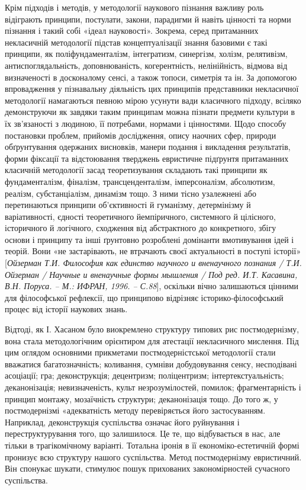 Крім підходів і методів, у методології наукового пізнання важливу роль
відіграють принципи, постулати, закони, парадигми й навіть цінності та норми
пізнання і такий собі «ідеал науковості». Зокрема, серед притаманних
некласичній методології підстав концептуалізації знання базовими є такі
принципи, як поліфундаменталізм, інтегратизм, синергізм, холізм, релятивізм,
антиспоглядальність, доповнюваність, когерентність, нелінійність, відмова від
визначеності в досконалому сенсі, а також топоси, симетрія та ін. За допомогою
впровадження у пізнавальну діяльність цих принципів представники
некласичної методології намагаються певною мірою усунути вади класичного
підходу, всіляко демонструючи як завдяки таким принципам можна пізнати
предмети культури в їх зв’язаності з людиною, її потребами, нормами і
цінностями. Щодо способу постановки проблем, прийомів дослідження, опису
наочних сфер, природи обґрунтування одержаних висновків, манери подання і
викладення результатів, форми фіксації та відстоювання тверджень евристичне
підґрунтя притаманних класичній методології засад теоретизування складають
такі принципи як фундаменталізм, фіналізм, трансценденталізм, імперсоналізм,
абсолютизм, реалізм, субстанціалізм, динамізм тощо. З ними тісно узалежнені
або перетинаються принципи об’єктивності й гуманізму, детермінізму й
варіативності, єдності теоретичного йемпіричного, системного й цілісного,
історичного й логічного, сходження від абстрактного до конкретного, збігу
основи і принципу та інші ґрунтовно розроблені домінанти вмотивування ідей і
теорій. Вони «не застарівають, не втрачають своєї актуальності в поступі
історії» [\textit{Ойзерман Т.И. Философия как единство научного и вненаучного
познания / Т.И. Ойзерман / Научные и вненаучные формы мышления / Под ред.
И.Т. Касавина, В.Н. Поруса. – М.: ИФРАН, 1996. – С.88}], оскільки вічно
залишаються цінними для філософської рефлексії, що принципово відрізняє
історико-філософський процес від історії наукових знань.

Відтоді, як І. Хасаном було виокремлено структуру типових рис
постмодернізму, вона стала методологічним орієнтиром для атестації
некласичного мислення. Під цим оглядом основними прикметами
постмодерністської методології стали вважатися багатозначність; коливання,
сумніви добудовування сенсу, несподівані асоціації; гра; деконструкція;
децентризм; поліцентризм; інтертекстуальність; деканонізація; невизначеність,
культ незрозумілостей, помилок; фрагментарність і принцип монтажу,
мозаїчність структури; деканонізація тощо. До того ж, у постмодернізмі
«адекватність методу перевіряється його застосуванням. Наприклад,
деконструкція суспільства означає його руйнування і переструктурування того,
що залишилося. Це те, що відбувається в нас, але тільки в трагікомічному
варіанті. Тотальна іронія в її економіко-естетичній формі пронизує всю
структуру нашого суспільства. Метод постмодернізму евристичний. Він
спонукає шукати, стимулює пошук прихованих закономірностей сучасного
суспільства.

